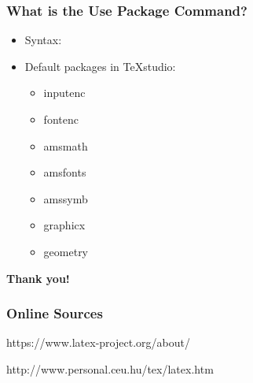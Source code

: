 \documentclass[17pt]{beamer}
\begin{document}
	\begin{frame}
		\frametitle{What is the Use Package Command?}
		
		\begin{itemize}
			
			\item Syntax: \begin{minipage}[m]{0.6\textwidth}
				
			\end{minipage}
			\item \pause Default packages in TeXstudio:
			\begin{itemize}
				\item \pause inputenc
				\item \pause fontenc
				\item \pause amsmath
				\item \pause amsfonts
				\item amssymb
				\item graphicx
				\item geometry
			\end{itemize}
		\end{itemize}
		
	\end{frame}	
	

    \begin{frame}
    	\begin{center}
    		\textbf{\LARGE Thank you!}
    	\end{center}
    \end{frame}

	\begin{frame}
		\frametitle{Online Sources}
		https://www.latex-project.org/about/
		
		http://www.personal.ceu.hu/tex/latex.htm
	\end{frame}	
	
\end{document}
